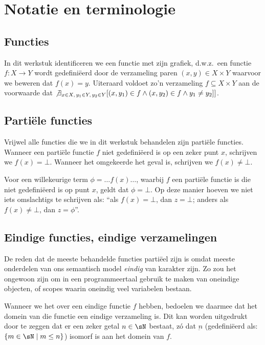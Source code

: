 \chapter{Notatie en terminologie}

\section{Functies}

In dit werkstuk identificeren we een functie met zijn grafiek, d.w.z.~een functie $f : X \to Y$ wordt gedefiniëerd door de verzameling paren $(x, y) \in X \times Y$ waarvoor we beweren dat $f(x) = y$. Uiteraard voldoet zo'n verzameling $f \subseteq X \times Y$ aan de voorwaarde dat $\not \exists_{x \in X,\, y_1 \in Y,\, y_2 \in Y} [ (x, y_1) \in f \land (x, y_2) \in f \land y_1 \neq y_2 ] ]$.

\section{Partiële functies}

Vrijwel alle functies die we in dit werkstuk behandelen zijn partiële functies. Wanneer een partiële functie $f$ niet gedefiniëerd is op een zeker punt $x$, schrijven we $f(x) = \bot$. Wanneer het omgekeerde het geval is, schrijven we $f(x) \neq \bot$.

Voor een willekeurige term $\phi = \dots f(x)\dots$, waarbij $f$ een partiële functie is die niet gedefiniëerd is op punt $x$, geldt dat $\phi = \bot$. Op deze manier hoeven we niet iets omslachtigs te schrijven als: ``als $f(x) = \bot$, dan $z = \bot$; anders als $f(x) \neq \bot$, dan $z = \phi$''.

\section{Eindige functies, eindige verzamelingen}

De reden dat de meeste behandelde functies partiëel zijn is omdat meeste onderdelen van ons semantisch model \emph{eindig} van karakter zijn. Zo zou het ongewoon zijn om in een programmeertaal gebruik te maken van oneindige objecten, of scopes waarin oneindig veel variabelen bestaan.

Wanneer we het over een eindige functie $f$ hebben, bedoelen we daarmee dat het domein van die functie een eindige verzameling is. Dit kan worden uitgedrukt door te zeggen dat er een zeker getal $n \in \sN$ bestaat, zó dat $\underbar{n}$ (gedefiniëerd als: $\{m \in \sN \mid m \le n\}$) isomorf is aan het domein van $f$.

